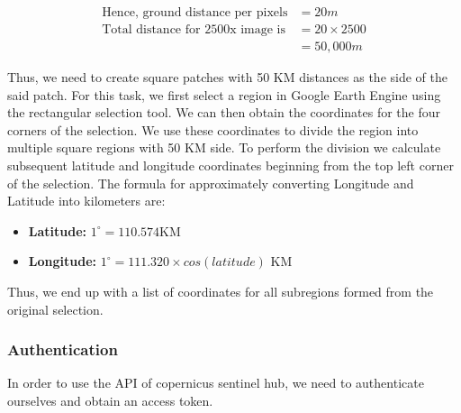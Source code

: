 \begin{align*}
    \text{Hence, ground distance per pixels} &= 20m \\
    \text{Total distance for 2500x image is} &= 20\times2500 \\
    &= 50,000m
\end{align*}

Thus, we need to create square patches with 50 KM distances as the side of the said patch. For this task, we first select a region in Google Earth Engine using the rectangular selection tool. We can then obtain the coordinates for the four corners of the selection. We use these coordinates to divide the region into multiple square regions with 50 KM side. To perform the division we calculate subsequent latitude and longitude coordinates beginning from the top left corner of the selection. The formula for approximately converting Longitude and Latitude into kilometers are:

\begin{itemize}
    \item \textbf{Latitude: } $1^\circ = 110.574$KM
    \item \textbf{Longitude:} $1^\circ = 111.320\times cos(latitude)$ KM
\end{itemize}

Thus, we end up with a list of coordinates for all subregions formed from the original selection.

\subsubsection{Authentication}
In order to use the API of copernicus sentinel hub, we need to authenticate ourselves and obtain an access token.